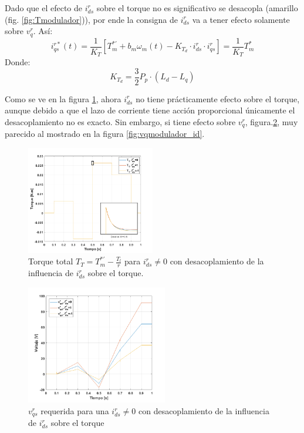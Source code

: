 \documentclass[10pt]{article}
\begin{document}
Dado que el efecto de $i^{r}_{ds}$ sobre el torque no es significativo se desacopla (amarillo (fig. \ref{fig:Tmodulador})), por ende la consigna de $i^{r}_{ds}$ va a tener efecto solamente sobre $v^{r}_{q}$. Así:
			\begin{equation}
	i^{r*}_{qs}(t)=\frac{1}{K_{T}}[T^{*'}_{m}+b_{m}\omega_{m}(t)-K_{T_{d}}\cdot i^{r}_{ds}\cdot i^{r}_{qs}]=\frac{1}{K_{T}}T^{*}_{m}
	\label{eq:2.1.2.k.8}
	\end{equation}
	Donde:
				\begin{equation}
	K_{T_{d}}=\frac{3}{2}P_{p}\cdot (L_{d}-L_{q})
	\label{eq:2.1.2.k.9}
	\end{equation}
	
	Como se ve en la figura \ref{fig:TTmodulador_id2}, ahora $i^{r}_{ds}$ no tiene prácticamente efecto sobre el torque, aunque debido a que el lazo de corriente tiene acción proporcional únicamente el desacoplamiento no es exacto. Sin embargo, si tiene efecto sobre $v^{r}_{q}$, figura.\ref{fig:vqmodulador_id2}, muy parecido al mostrado en la figura \ref{fig:vqmodulador_id}.
		 	\begin{figure}[h!]
	\centering
	\includegraphics[width=0.5\textwidth]{TTmodulador_id2.png}
	\caption{\label{fig:TTmodulador_id2}Torque total $T_{T}=T^{*'}_{m}-\frac{T_{l}}{r}$ para $i^{r}_{ds}\neq0$ con desacoplamiento de la influencia de $i^{r}_{ds}$ sobre el torque. }
	\end{figure}
			 	\begin{figure}[h!]
	\centering
	\includegraphics[width=0.55\textwidth]{Tmodulador_id2.png}
	\caption{\label{fig:vqmodulador_id2}$v^{r}_{qs}$ requerida para una $i^{r}_{ds}\neq0$ con desacoplamiento de la influencia de $i^{r}_{ds}$ sobre el torque }
	\end{figure}
	
\end{document}
